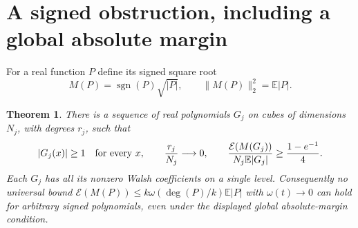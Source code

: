 \documentclass[10pt]{article}
\newtheorem{theorem}{Theorem}
\newcommand{\E}{\mathbb E}
\newcommand{\En}{\mathcal E}
\newcommand{\sgn}{\operatorname{sgn}}
\begin{document}
\section{A signed obstruction, including a global absolute margin}
For a real function $P$ define its signed square root
\[
 M(P)=\sgn(P)\sqrt{|P|},\qquad \|M(P)\|_2^2=\E|P|.
\]

\begin{theorem}\label{thm:signed}
There is a sequence of real polynomials $G_j$ on cubes of dimensions
$N_j$, with degrees $r_j$, such that
\[
 |G_j(x)|\ge1\quad\hbox{for every }x,\qquad
 \frac{r_j}{N_j}\longrightarrow0,\qquad
 \frac{\En(M(G_j))}{N_j\E|G_j|}\ge\frac{1-e^{-1}}4.
\]
Each $G_j$ has all its nonzero Walsh coefficients on a single level.
Consequently no universal bound
$\En(M(P))\le k\omega(\deg(P)/k)\E|P|$ with $\omega(t)\to0$
can hold for arbitrary signed polynomials, even under the displayed
global absolute-margin condition.
\end{theorem}
\end{document}
